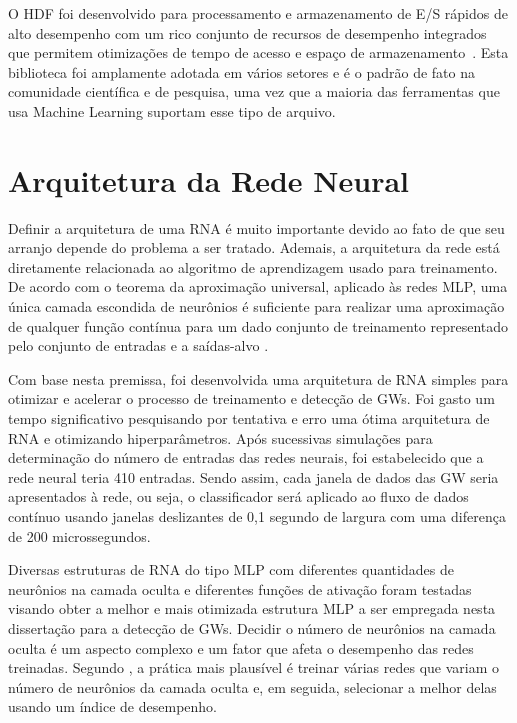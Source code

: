 O HDF foi desenvolvido para processamento e armazenamento de E/S rápidos de alto desempenho com um rico conjunto de recursos de desempenho integrados que permitem otimizações de tempo de acesso e espaço de armazenamento~\cite{hdf}. Esta biblioteca foi amplamente adotada em vários setores e é o padrão de fato na comunidade científica e de pesquisa, uma vez que a maioria das ferramentas que usa Machine Learning suportam esse tipo de arquivo.

\section{Arquitetura da Rede Neural}

Definir a arquitetura de uma RNA é muito importante devido ao fato de que seu arranjo depende do problema a ser tratado. Ademais, a arquitetura da rede está diretamente relacionada ao algoritmo de aprendizagem usado para treinamento. De acordo com o teorema da aproximação universal, aplicado às redes MLP, uma única camada escondida de neurônios é suficiente para realizar uma aproximação de qualquer função contínua para um dado conjunto de treinamento representado pelo conjunto de entradas e a saídas-alvo \cite{cybenko1989approximation, haykin2007redes}.

Com base nesta premissa, foi desenvolvida uma arquitetura de RNA simples para otimizar e acelerar o processo de treinamento e detecção de GWs. Foi gasto um tempo significativo pesquisando por tentativa e erro uma ótima arquitetura de RNA e otimizando hiperparâmetros. Após sucessivas simulações para determinação do número de entradas das redes neurais, foi estabelecido que a rede neural teria 410 entradas. Sendo assim, cada janela de dados das GW seria apresentados à rede, ou seja, o classificador será aplicado ao fluxo de dados contínuo usando janelas deslizantes de 0,1 segundo de largura com uma diferença de 200 microssegundos.

Diversas estruturas de RNA do tipo MLP com diferentes quantidades de neurônios na camada oculta e diferentes funções de ativação foram testadas visando obter a melhor e mais otimizada estrutura MLP a ser empregada nesta dissertação para a detecção de GWs. Decidir o número de neurônios na camada oculta é um aspecto complexo e um fator que afeta o desempenho das redes treinadas. Segundo \cite{OKOH201619}, a prática mais plausível é treinar várias redes que variam o número de neurônios da camada oculta e, em seguida, selecionar a melhor delas usando um índice de desempenho.


